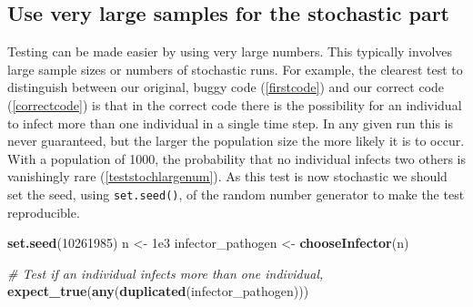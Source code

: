 \documentclass[]{elsarticle} %
\newenvironment{Shaded}{\begin{snugshade}}{\end{snugshade}}
\newcommand{\CommentTok}[1]{\textcolor[rgb]{0.56,0.35,0.01}{\textit{#1}}}
\newcommand{\DataTypeTok}[1]{\textcolor[rgb]{0.13,0.29,0.53}{#1}}
\newcommand{\DecValTok}[1]{\textcolor[rgb]{0.00,0.00,0.81}{#1}}
\newcommand{\FloatTok}[1]{\textcolor[rgb]{0.00,0.00,0.81}{#1}}
\newcommand{\KeywordTok}[1]{\textcolor[rgb]{0.13,0.29,0.53}{\textbf{#1}}}
\newcommand{\NormalTok}[1]{#1}
\newcommand{\OperatorTok}[1]{\textcolor[rgb]{0.81,0.36,0.00}{\textbf{#1}}}
\newcommand{\StringTok}[1]{\textcolor[rgb]{0.31,0.60,0.02}{#1}}
\begin{document}
\begin{Shaded}
\end{Shaded}

\hypertarget{largesamples}{%
\subsection*{Use very large samples for the stochastic part}\label{largesamples}}

Testing can be made easier by using very large numbers.
This typically involves large sample sizes or numbers of stochastic runs.
For example, the clearest test to distinguish between our original, buggy code (\ref{firstcode}) and our correct code (\ref{correctcode}) is that in the correct code there is the possibility for an individual to infect more than one individual in a single time step.
In any given run this is never guaranteed, but the larger the population size the more likely it is to occur.
With a population of 1000, the probability that no individual infects two others is vanishingly rare (\ref{teststochlargenum}).
As this test is now stochastic we should set the seed, using \texttt{set.seed()}, of the random number generator to make the test reproducible.
\newline
{}\label{teststochlargenum}

\begin{Shaded}
\begin{Highlighting}[]
\KeywordTok{set.seed}\NormalTok{(}\DecValTok{10261985}\NormalTok{)}
\NormalTok{n <-}\StringTok{ }\FloatTok{1e3}
\NormalTok{infector_pathogen <-}\StringTok{ }\KeywordTok{chooseInfector}\NormalTok{(n)}

\CommentTok{# Test if an individual infects more than one individual, }
\KeywordTok{expect_true}\NormalTok{(}\KeywordTok{any}\NormalTok{(}\KeywordTok{duplicated}\NormalTok{(infector_pathogen)))}
\end{Highlighting}
\end{Shaded}
\end{document}
